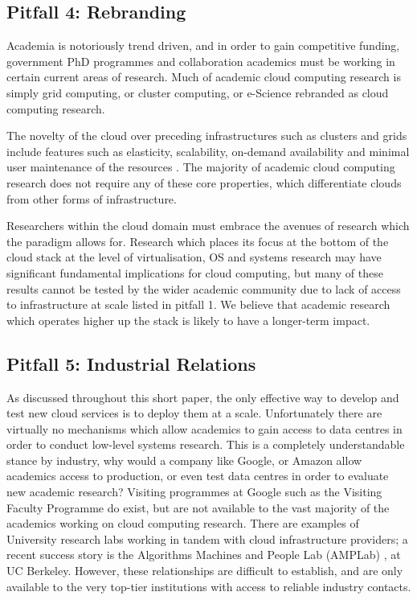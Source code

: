 \documentclass[letterpaper,twocolumn,10pt]{article}
\begin{document}
\subsection*{Pitfall 4: Rebranding}

Academia is notoriously trend driven, and in order to gain competitive funding, government PhD programmes and collaboration academics must be working in certain current areas of research. Much of academic cloud computing research is simply grid computing, or cluster computing, or e-Science rebranded as cloud computing research. 

The novelty of the cloud over preceding infrastructures such as clusters and grids include features such as elasticity, scalability, on-demand availability and minimal user maintenance of the resources \cite{cloudcompared-1}. The majority of academic cloud computing research does not require any of these core properties, which differentiate clouds from other forms of infrastructure. 



Researchers within the cloud domain must embrace the avenues of research which the paradigm allows for. Research which places its focus at the bottom of the cloud stack at the level of virtualisation, OS and systems research may have significant fundamental implications for cloud computing, but many of these results cannot be tested by the wider academic community due to lack of access to infrastructure at scale listed in pitfall 1. We believe that academic research which operates higher up the stack is likely to have a longer-term impact.

\subsection*{Pitfall 5: Industrial Relations}

As discussed throughout this short paper, the only effective way to develop and test new cloud services is to deploy them at a scale. Unfortunately there are virtually no mechanisms which allow academics to gain access to data centres in order to conduct low-level systems research. This is a completely understandable stance by industry, why would a company like Google, or Amazon allow academics access to production, or even test data centres in order to evaluate new academic research? Visiting programmes at Google such as the Visiting Faculty Programme \cite{google} do exist, but are not available to the vast majority of the academics working on cloud computing research. There are examples of University research labs working in tandem with cloud infrastructure providers; a recent success story is the Algorithms Machines and People Lab (AMPLab) \cite{amplab}, at UC Berkeley. However, these relationships are difficult to establish, and are only available to the very top-tier institutions with access to reliable industry contacts.
\end{document}
